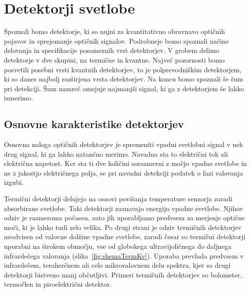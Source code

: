 
\chapter{Detektorji svetlobe}

Spoznali bomo detektorje, ki so nujni za kvantitativno obravnavo
optičnih pojavov in sprejemanje optičnih signalov. Podrobneje bomo spoznali
načine delovanja in specifikacije posameznih vrst detektorjev.
V grobem delimo detektorje v dve skupini, na termične in 
kvantne. Največ pozornosti bomo posvetili posebni vrsti kvantnih 
detektorjev, to je polprevodniškim detektorjem, ki so danes najbolj razširjena vrsta detektorjev.
Na koncu bomo spoznali še šum pri detekciji. Šum namreč omejuje najmanjši 
signal, ki ga z detektorjem še lahko izmerimo.

\section{Osnovne karakteristike detektorjev}
Osnovna naloga optičnih detektorjev je spremeniti vpadni svetlobni signal 
v nek drug signal, ki ga lahko natančno merimo. Navadno sta to električni tok 
ali električna napetost. Ker sta ti dve količini sorazmerni z močjo vpadne svetlobe 
in ne z jakostjo električnega polja, se pri navadni detekciji 
podatek o fazi valovanja izgubi. 

Termični detektorji delujejo na osnovi povišanja temperature senzorja 
zaradi absorbirane svetlobe. Taki detektorji zaznavajo energijo 
vpadne svetlobe. Njihov odziv je razmeroma počasen, zato jih uporabljamo
predvsem za merjenje optične moči, ki je lahko tudi zelo velika. 
Po drugi strani je odziv termičnih detektorjev neodvisen
od valovne dolžine vpadne svetlobe, zaradi česar so termični detektorji uporabni na 
širokem območju, vse od globokega ultravijoličnega do daljnega infrardečega valovanja
(slika~\ref{fig:shemaTermKv}). 
Uporaba
prevlada predvsem v infrardečem, teraherčnem ali celo mikrovalovnem delu spektra, kjer so 
drugi detektorji bistveno manj občutljivi. 
Primeri termičnih detektorjev so bolometer, termočlen in piroelektrični detektor.


